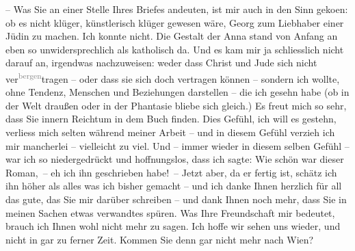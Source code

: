 \pstart
           – Was Sie an einer Stelle Ihres Briefes andeuten, ist mir auch in den Sinn geko{\geminationm}en: ob es nicht klüger, künstlerisch klüger gewesen
               wäre, Georg zum Liebhaber
               einer Jüdin zu machen. Ich konnte nicht. Die Gestalt der Anna stand von Anfang an eben so
               unwidersprechlich als katholisch da. Und es kam mir ja schliesslich nicht darauf an,
               irgendwas nachzuweisen: weder dass Christ und Jude sich nicht ver\substVorne{}\textsuperscript{\textcolor{gray}{bergen}}\substDazwischen{}tragen\substHinten{} – oder dass sie sich doch vertragen können – sondern ich wollte, ohne
               Tendenz, {\pb}Menschen und Beziehungen darstellen –
               die ich gesehn habe (ob in der Welt draußen oder in der Phantasie bliebe sich
               gleich.)  Es freut mich so sehr, dass Sie
               innern Reichtum in dem Buch
               finden. Dies Gefühl, ich will es gestehn, verliess mich selten während meiner Arbeit
               – und in diesem Gefühl verzieh ich mir mancherlei – vielleicht zu viel. Und \introOben{}–\introOben{} immer wieder in diesem selben Gefühl – war ich so
               niedergedrückt und hoffnungslos, dass ich sagte: Wie schön war dieser Roman, – eh ich
               ihn geschrieben habe! – Jetzt aber, da er fertig ist, schätz ich ihn höher als alles
               was ich bisher gemacht – und ich danke Ihnen herzlich für all das gute, das Sie mir
                  {\pb}darüber schreiben – und dank Ihnen noch mehr,
               dass Sie in meinen Sachen etwas verwandtes spüren. Was Ihre Freundschaft mir
               bedeutet, brauch ich Ihnen wohl nicht mehr zu sagen. Ich hoffe wir sehen uns wieder,
               und nicht in gar zu ferner Zeit. Kommen Sie denn gar nicht mehr nach Wien?\pend
           
